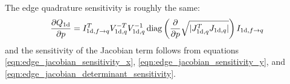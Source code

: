 The edge quadrature sensitivity is roughly the same:
%
\begin{equation}
\frac{\partial{Q_\textrm{1d}}}{\partial{p}} = I_{\textrm{1d},f \rightarrow q}^T V_{\textrm{1d},q}^{-T} V_{\textrm{1d},q}^{-1}
\operatorname{diag}\left( \frac{\partial{}}{\partial{p}} \sqrt{|J_{\textrm{1d},q}^T J_{\textrm{1d},q}|} \right)
I_{\textrm{1d}, f \rightarrow q}
\end{equation}
%
and the sensitivity of the Jacobian term follows from equations \ref{eqn:edge_jacobian_sensitivity_x}, \ref{eqn:edge_jacobian_sensitivity_y}, and \ref{eqn:edge_jacobian_determinant_sensitivity}.





